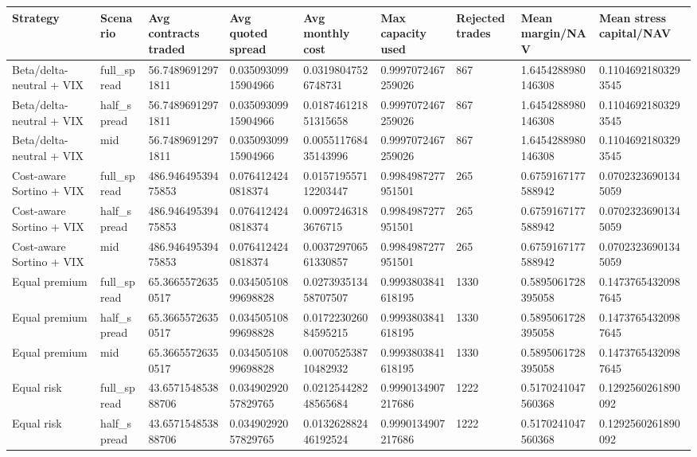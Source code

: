 \begin{tabular}{lllllllll}
\toprule
Strategy & Scenario & Avg contracts traded & Avg quoted spread & Avg monthly cost & Max capacity used & Rejected trades & Mean margin/NAV & Mean stress capital/NAV \\
\midrule
Beta/delta-neutral + VIX & full\_spread & 56.74896912971811 & 0.03509309915904966 & 0.03198047526748731 & 0.9997072467259026 & 867 & 1.6454288980146308 & 0.11046921803293545 \\
Beta/delta-neutral + VIX & half\_spread & 56.74896912971811 & 0.03509309915904966 & 0.018746121851315658 & 0.9997072467259026 & 867 & 1.6454288980146308 & 0.11046921803293545 \\
Beta/delta-neutral + VIX & mid & 56.74896912971811 & 0.03509309915904966 & 0.005511768435143996 & 0.9997072467259026 & 867 & 1.6454288980146308 & 0.11046921803293545 \\
Cost-aware Sortino + VIX & full\_spread & 486.94649539475853 & 0.0764124240818374 & 0.015719557112203447 & 0.9984987277951501 & 265 & 0.6759167177588942 & 0.07023236901345059 \\
Cost-aware Sortino + VIX & half\_spread & 486.94649539475853 & 0.0764124240818374 & 0.00972463183676715 & 0.9984987277951501 & 265 & 0.6759167177588942 & 0.07023236901345059 \\
Cost-aware Sortino + VIX & mid & 486.94649539475853 & 0.0764124240818374 & 0.003729706561330857 & 0.9984987277951501 & 265 & 0.6759167177588942 & 0.07023236901345059 \\
Equal premium & full\_spread & 65.36655726350517 & 0.03450510899698828 & 0.027393513458707507 & 0.9993803841618195 & 1330 & 0.5895061728395058 & 0.14737654320987645 \\
Equal premium & half\_spread & 65.36655726350517 & 0.03450510899698828 & 0.017223026084595215 & 0.9993803841618195 & 1330 & 0.5895061728395058 & 0.14737654320987645 \\
Equal premium & mid & 65.36655726350517 & 0.03450510899698828 & 0.007052538710482932 & 0.9993803841618195 & 1330 & 0.5895061728395058 & 0.14737654320987645 \\
Equal risk & full\_spread & 43.657154853888706 & 0.03490292057829765 & 0.021254428248565684 & 0.9990134907217686 & 1222 & 0.5170241047560368 & 0.1292560261890092 \\
Equal risk & half\_spread & 43.657154853888706 & 0.03490292057829765 & 0.013262882446192524 & 0.9990134907217686 & 1222 & 0.5170241047560368 & 0.1292560261890092 \\

\end{tabular}
